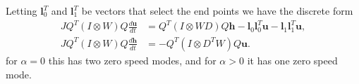 \documentclass[american]{article}
\renewcommand{\vec}[1] {\ensuremath{\bm{#1}}}
\newcommand{\mat}[1] {\ensuremath{#1}}
\newcommand{\der}  [2]{\frac{d#1}{d#2}}
\begin{document}
Letting $\vec{l}_{0}^{T}$ and $\vec{l}_{1}^{T}$ be vectors that select the end
points we have the discrete form
\begin{equation}
  \begin{split}
    J \mat{Q}^{T} (\mat{I} \otimes \mat{W}) \mat{Q} \der{\vec{u}}{t}
    &=
    \mat{Q}^{T} (\mat{I} \otimes \mat{W} \mat{D}) \mat{Q} \vec{h}
    -\vec{l}_{0} \vec{l}_{0}^{T} \vec{u}
    -\vec{l}_{1} \vec{l}_{1}^{T} \vec{u},\\
    J \mat{Q}^{T} (\mat{I} \otimes \mat{W}) \mat{Q} \der{\vec{h}}{t}
    &=
    -\mat{Q}^{T} (\mat{I} \otimes \mat{D}^{T} \mat{W}) \mat{Q} \vec{u}.
  \end{split}
\end{equation}
for $\alpha = 0$ this has two zero speed modes, and for $\alpha > 0$ it has one
zero speed mode.

\printbibliography{}
\end{document}
